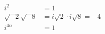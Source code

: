 \documentclass[preview]{standalone}
\begin{document}
\begin{align*}
i^2 &= 1 \\ \sqrt{-2}\sqrt{-8} &= i\sqrt{2} \cdot i\sqrt{8} = -4 \\ i^{4n} &= 1
\end{align*}
\end{document}

